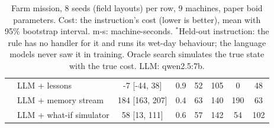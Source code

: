 \begin{table}[h!]
{\begin{tabular}{llcccccc}
 & LLM + lessons & -7 [-44, 38] & 0.9 & 52 & 105 & 0 & 48 \\
 & LLM + memory stream & 184 [163, 207] & 0.4 & 63 & 140 & 190 & 63 \\
 & LLM + what-if simulator & 58 [13, 111] & 0.6 & 57 & 142 & 54 & 102 \\
\hline
\end{tabular}}
\caption{Farm mission, 8 seeds (field layouts) per row, 9 machines, paper boid parameters. Cost: the instruction's cost (lower is better), mean with 95\% bootstrap interval. m-s: machine-seconds. $^*$Held-out instruction: the rule has no handler for it and runs its wet-day behaviour; the language models never saw it in training. Oracle search simulates the true state with the true cost. LLM: qwen2.5:7b.}
\label{tab:farm}
\end{table}
